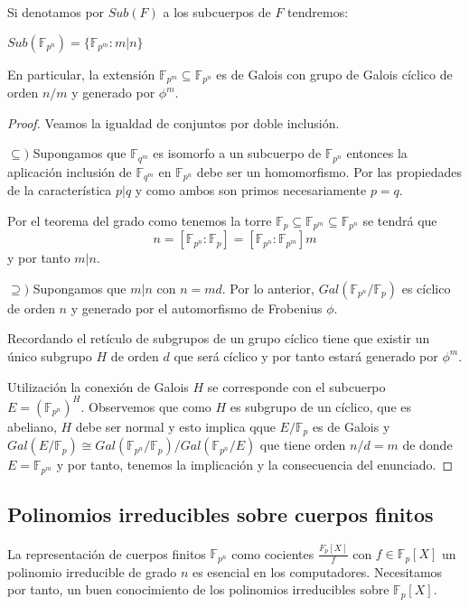 \begin{proposition}
	Si denotamos por $Sub(F)$ a los subcuerpos de $F$ tendremos:
	
	$Sub(\mathbb{F}_{p^n}) = \{\mathbb{F}_{p^m}:m|n\}$
	
	En particular, la extensión $\mathbb{F}_{p^m} \subseteq \mathbb{F}_{p^n}$ es de Galois con grupo de Galois cíclico de orden $n/m$ y generado por $\phi^m$.
\end{proposition}
\begin{proof}
	Veamos la igualdad de conjuntos por doble inclusión. 
	
	$\subseteq)$ Supongamos que $\mathbb{F}_{q^m}$ es isomorfo a un subcuerpo de $\mathbb{F}_{p^n}$ entonces la aplicación inclusión de $\mathbb{F}_{q^m}$ en $\mathbb{F}_{p^n}$ debe ser un homomorfismo. Por las propiedades de la característica $p|q$ y como ambos son primos necesariamente $p = q$. 
	
	Por el teorema del grado como tenemos la torre $\mathbb{F}_{p} \subseteq \mathbb{F}_{p^m} \subseteq \mathbb{F}_{p^n}$ se tendrá que $$n = [\mathbb{F}_{p^n}:\mathbb{F}_{p}] = [\mathbb{F}_{p^n}:\mathbb{F}_{p^m}]m$$ y por tanto $m|n$. 
	
	$\supseteq)$ Supongamos que $m|n$ con $n = md$. Por lo anterior, $Gal(\mathbb{F}_{p^n}/\mathbb{F}_p)$ es cíclico de orden $n$ y generado por el automorfismo de Frobenius $\phi$. 
	
	Recordando el retículo de subgrupos de un grupo cíclico tiene que existir un único subgrupo $H$ de orden $d$ que será cíclico  y por tanto estará generado por $\phi^m$. 
	
	Utilización la conexión de Galois $H$ se corresponde con el subcuerpo $E = (\mathbb{F}_{p^n})^H$. Observemos que como $H$ es subgrupo de un cíclico, que es abeliano, $H$ debe ser normal y esto implica qque $E/\mathbb{F}_p$ es de Galois y $Gal(E/\mathbb{F}_p) \cong Gal(\mathbb{F}_{p^n}/\mathbb{F}_p)/Gal(\mathbb{F}_{p^n}/E)$ que tiene orden $n/d = m$ de donde $E = \mathbb{F}_{p^m}$ y por tanto, tenemos la implicación y la consecuencia del enunciado. 
\end{proof}


\subsection{Polinomios irreducibles sobre cuerpos finitos}

La representación de cuerpos finitos $\mathbb{F}_{p^n}$ como cocientes $\frac{F_p[X]}{f}$ con $f \in \mathbb{F}_p[X]$ un polinomio irreducible de grado $n$ es esencial en los computadores. Necesitamos por tanto, un buen conocimiento de los polinomios irreducibles sobre $\mathbb{F}_p[X]$.

